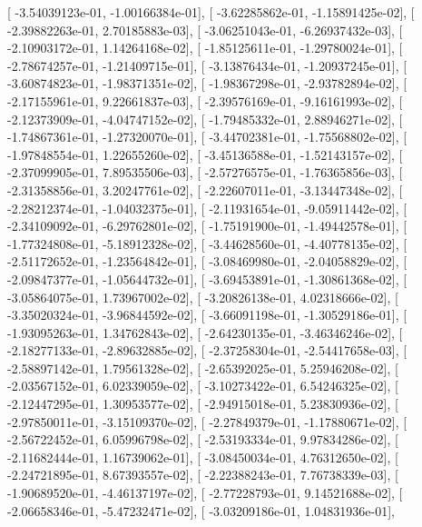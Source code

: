 \documentclass{article}
\begin{document}
       [ -3.54039123e-01,  -1.00166384e-01],
       [ -3.62285862e-01,  -1.15891425e-02],
       [ -2.39882263e-01,   2.70185883e-03],
       [ -3.06251043e-01,  -6.26937432e-03],
       [ -2.10903172e-01,   1.14264168e-02],
       [ -1.85125611e-01,  -1.29780024e-01],
       [ -2.78674257e-01,  -1.21409715e-01],
       [ -3.13876434e-01,  -1.20937245e-01],
       [ -3.60874823e-01,  -1.98371351e-02],
       [ -1.98367298e-01,  -2.93782894e-02],
       [ -2.17155961e-01,   9.22661837e-03],
       [ -2.39576169e-01,  -9.16161993e-02],
       [ -2.12373909e-01,  -4.04747152e-02],
       [ -1.79485332e-01,   2.88946271e-02],
       [ -1.74867361e-01,  -1.27320070e-01],
       [ -3.44702381e-01,  -1.75568802e-02],
       [ -1.97848554e-01,   1.22655260e-02],
       [ -3.45136588e-01,  -1.52143157e-02],
       [ -2.37099905e-01,   7.89535506e-03],
       [ -2.57276575e-01,  -1.76365856e-03],
       [ -2.31358856e-01,   3.20247761e-02],
       [ -2.22607011e-01,  -3.13447348e-02],
       [ -2.28212374e-01,  -1.04032375e-01],
       [ -2.11931654e-01,  -9.05911442e-02],
       [ -2.34109092e-01,  -6.29762801e-02],
       [ -1.75191900e-01,  -1.49442578e-01],
       [ -1.77324808e-01,  -5.18912328e-02],
       [ -3.44628560e-01,  -4.40778135e-02],
       [ -2.51172652e-01,  -1.23564842e-01],
       [ -3.08469980e-01,  -2.04058829e-02],
       [ -2.09847377e-01,  -1.05644732e-01],
       [ -3.69453891e-01,  -1.30861368e-02],
       [ -3.05864075e-01,   1.73967002e-02],
       [ -3.20826138e-01,   4.02318666e-02],
       [ -3.35020324e-01,  -3.96844592e-02],
       [ -3.66091198e-01,  -1.30529186e-01],
       [ -1.93095263e-01,   1.34762843e-02],
       [ -2.64230135e-01,  -3.46346246e-02],
       [ -2.18277133e-01,  -2.89632885e-02],
       [ -2.37258304e-01,  -2.54417658e-03],
       [ -2.58897142e-01,   1.79561328e-02],
       [ -2.65392025e-01,   5.25946208e-02],
       [ -2.03567152e-01,   6.02339059e-02],
       [ -3.10273422e-01,   6.54246325e-02],
       [ -2.12447295e-01,   1.30953577e-02],
       [ -2.94915018e-01,   5.23830936e-02],
       [ -2.97850011e-01,  -3.15109370e-02],
       [ -2.27849379e-01,  -1.17880671e-02],
       [ -2.56722452e-01,   6.05996798e-02],
       [ -2.53193334e-01,   9.97834286e-02],
       [ -2.11682444e-01,   1.16739062e-01],
       [ -3.08450034e-01,   4.76312650e-02],
       [ -2.24721895e-01,   8.67393557e-02],
       [ -2.22388243e-01,   7.76738339e-03],
       [ -1.90689520e-01,  -4.46137197e-02],
       [ -2.77228793e-01,   9.14521688e-02],
       [ -2.06658346e-01,  -5.47232471e-02],
       [ -3.03209186e-01,   1.04831936e-01],
\end{document}
